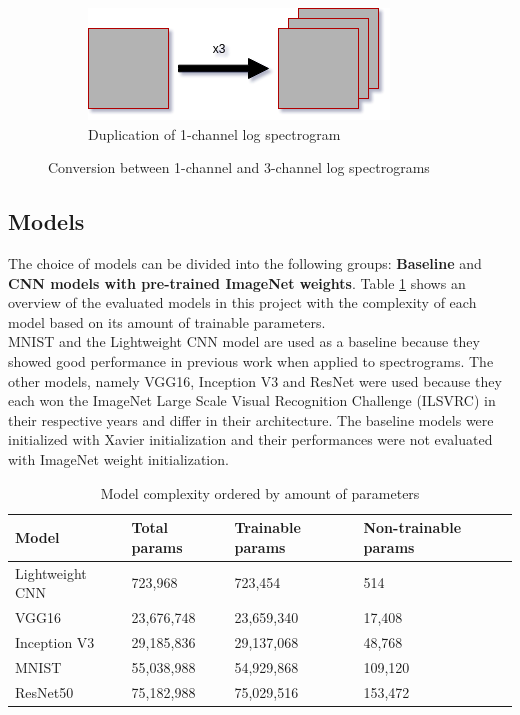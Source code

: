 \documentclass{article}
\theoremstyle{definition}
\theoremstyle{remark}
\begin{document}
\begin{figure}[h!]
\par\bigskip
\begin{subfigure}{.5\textwidth}
  \centering
  \includegraphics[width=1\linewidth]{img/grayscale_multiply.png}
  \caption{Duplication of 1-channel log spectrogram}
  \label{fig:sub2}
\end{subfigure}
\caption{Conversion between 1-channel and 3-channel log spectrograms}
\label{fig:channel_conversion}
\end{figure}



\newpage

\subsection{Models} \label{models}

The choice of models can be divided into the following groups: \textbf{Baseline} and \textbf{CNN models with pre-trained ImageNet weights}. Table \ref{tab:model_complexity} shows an overview of the evaluated models in this project with the complexity of each model based on its amount of trainable parameters.\\
MNIST and the Lightweight CNN model are used as a baseline because they showed good performance in previous work when applied to spectrograms. The other models, namely VGG16, Inception V3 and ResNet were used because they each won the ImageNet Large Scale Visual Recognition Challenge (ILSVRC) in their respective years and differ in their architecture. The baseline models were initialized with Xavier initialization and their performances were not evaluated with ImageNet weight initialization.\\


\begin{table}[h!]
\center
\begin{tabular}{|l|l|l|l|}
\hline
\textbf{Model} & \textbf{Total params} & \textbf{Trainable params} & \textbf{Non-trainable params} \\ \hline
Lightweight CNN & 723,968 & 723,454 & 514 \\ \hline
VGG16  		& 23,676,748   & 23,659,340        & 17,408 \\ \hline	
Inception V3	& 29,185,836   & 29,137,068  	   & 48,768	 \\ \hline
MNIST			& 55,038,988   & 54,929,868   	   & 109,120  \\ \hline
ResNet50  	& 75,182,988   & 75,029,516 	   & 153,472 \\ \hline	
\end{tabular}
\caption{Model complexity ordered by amount of parameters}
\label{tab:model_complexity}
\end{table}
\end{document}
